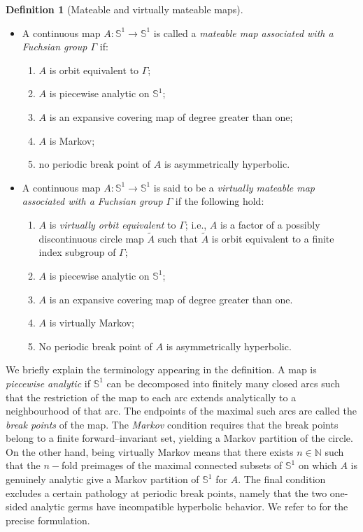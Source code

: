 \documentclass[11pt,a4paper, oneside]{amsart}
\theoremstyle{definition}
\newtheorem{defn}[thm]{Definition}
\theoremstyle{remark}
\numberwithin{equation}{section}
\def\N{{\mathbb{N}}}
\newcommand{\Circle}{{{\mathbb S}^1}}
\begin{document}
\begin{defn}[Mateable and virtually mateable maps]
	\label{Def:MateableCircleMap}
\leavevmode\par
\begin{itemize}	[leftmargin=8mm]
\item	A continuous map $A:\Circle\to\Circle$ is called a \emph{mateable map
		associated with a Fuchsian group $\Gamma$} if:
	\begin{enumerate}[leftmargin=6mm]
		\item $A$ is orbit equivalent to $\Gamma$;
		\item $A$ is piecewise analytic on $\Circle$;
		\item $A$ is an expansive covering map of degree greater than one;
		\item $A$ is Markov;
		\item no periodic break point of $A$ is asymmetrically hyperbolic.
	\end{enumerate}
    \smallskip
    
\item A continuous map $A:\Circle\to\Circle$ is said to be a \emph{virtually mateable map associated with a Fuchsian group $\Gamma$} if the following hold:
	\begin{enumerate}[leftmargin=6mm]
		\item $A$ is \emph{virtually orbit equivalent} to $\Gamma$; i.e., $A$ is a factor of a possibly discontinuous circle map $\widetilde{A}$ such that $\widetilde{A}$ is orbit equivalent to a finite index subgroup of $\Gamma$;
        \item $A$ is piecewise analytic on $\mathbb{S}^1$;
		\item $A$ is an expansive covering map of degree greater than one.
		\item $A$ is virtually Markov; 
		\item No periodic break point of $A$ is asymmetrically hyperbolic.
\end{enumerate}
\end{itemize}
\end{defn}

We briefly explain the terminology appearing in the definition.  A map is
\emph{piecewise analytic} if $\Circle$ can be decomposed into finitely many
closed arcs such that the restriction of the map to each arc extends
analytically to a neighbourhood of that arc.  The endpoints of the maximal such
arcs are called the \emph{break points} of the map.  The \emph{Markov}
condition requires that the break points belong to a finite forward--invariant
set, yielding a Markov partition of the circle. On the other hand, being virtually Markov means that there exists $n \in \N$ such that the  $n-$fold preimages of the maximal connected subsets of $\mathbb{S}^1$ on which $A$ is genuinely analytic give a Markov partition of $\mathbb{S}^1$ for $A$. The final condition excludes a
certain pathology at periodic break points, namely that the two one-sided
analytic germs have incompatible hyperbolic behavior. We refer to
\cite[\S2]{MM_survey} for the precise formulation.
\end{document}
